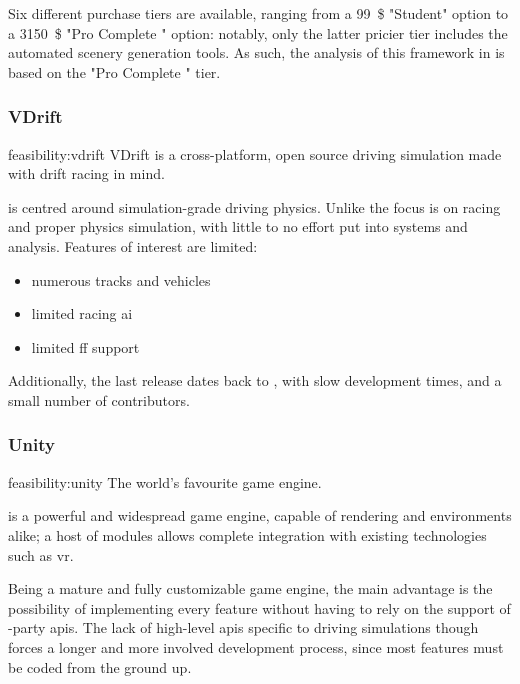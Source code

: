 Six different purchase tiers are available, ranging from a \SI{99}{\$} "Student" option to a \SI{3150}{\$} "Pro Complete " option: notably, only the latter pricier tier includes the automated scenery generation tools. As such, the analysis of this \gls{framework} in  is based on the "Pro Complete " tier.

\subsubsection{VDrift}

\begin{excerpt}{feasibility:vdrift}
    VDrift is a cross-platform, open source driving simulation made with drift racing in mind.
\end{excerpt}

 is centred around simulation-grade driving physics. Unlike  the focus is on racing and proper physics simulation, with little to no effort put into systems and analysis. Features of interest are limited:

\begin{itemize}
	\item numerous tracks and vehicles
    \item limited racing \gls{ai}
    \item limited \gls{ff} support
\end{itemize}

Additionally, the last release dates back to , with slow development times, and a small number of contributors.

\subsubsection{Unity}

\begin{excerpt}{feasibility:unity}
    The world's favourite game engine.
\end{excerpt}

 is a powerful and widespread game engine, capable of rendering  and  environments alike; a host of modules allows complete integration with existing technologies such as \gls{vr}.

Being a mature and fully customizable game engine, the main advantage is the possibility of implementing every \gls{feature} without having to rely on the support of -party \glspl{api}. The lack of high-level \glspl{api} specific to driving simulations though forces a longer and more involved development process, since most \glspl{feature} must be coded from the ground up.


